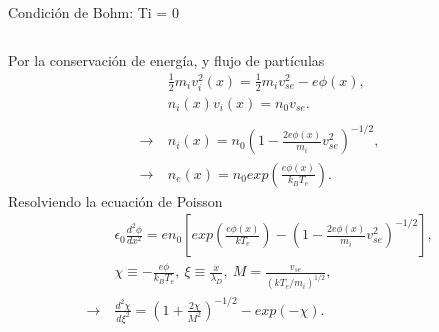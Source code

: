 \documentclass[11pt]{beamer}
\begin{document}
\begin{frame}[t]{Condici\'on de Bohm: Ti = 0}
\begin{columns}[t]
        \begin{column}{0.5\textwidth}
        \fontsize{6pt}{8}\selectfont
        Por la conservación de energía, y flujo de partículas
        \begin{align*}
        &\frac{1}{2} m_i v_i^2(x) = \frac{1}{2} m_i v_{se}^2 - e\phi(x), \\
        &n_i(x)v_i(x) = n_0v_{se}.\\ \\
        \rightarrow \ &n_i(x) = n_0\left(1 - \frac{2e\phi \left(x\right)}{m_i}v_{se}^2\right)^{-1/2}, \\
        \rightarrow \ &n_e\left(x\right) = n_0exp\left(\frac{e\phi\left(x\right)}{k_BT_e}\right).
        \end{align*}
        Resolviendo la ecuación de Poisson
        \begin{align*}
        &\epsilon_0 \frac{d^2\phi}{dx^2} =  en_0\left[exp\left( \frac{e\phi\left(x\right)}{kT_e} \right) - \left(1 -\frac{2e\phi\left(x\right)}{m_i}v_{se}^2 \right)^{-1/2} \right], \\
        &\chi \equiv -\frac{e\phi}{k_BT_e}, \ \xi \equiv \frac{x}{\lambda_D}, \ M = \frac{v_{se}}{\left( kT_e/m_i \right)^{1/2}}, \\
        \rightarrow \ &\frac{d^2\chi}{d\xi^2} = \left( 1+\frac{2\chi}{M^2} \right)^{-1/2} - exp\left( -\chi \right).
        \end{align*}
        \end{column}
        
        \end{columns}
        \end{frame}
\end{document}
